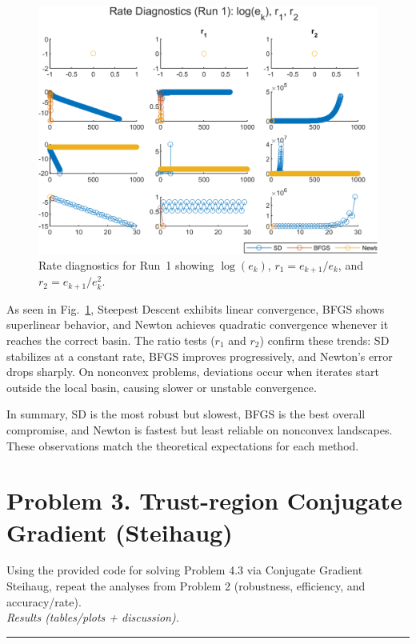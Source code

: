 \documentclass[11pt]{article}
\begin{document}
	\begin{figure}[htbp]
		\centering
		\includegraphics[width=\linewidth]{plots/accuracy_run1.png}
		\caption{Rate diagnostics for Run~1 showing $\log(e_k)$, $r_1=e_{k+1}/e_k$, and $r_2=e_{k+1}/e_k^2$.}
		\label{fig:accuracy}
	\end{figure}
	
	As seen in Fig.~\ref{fig:accuracy}, Steepest Descent exhibits linear convergence, BFGS shows superlinear behavior,
	and Newton achieves quadratic convergence whenever it reaches the correct basin.
	The ratio tests ($r_1$ and $r_2$) confirm these trends: SD stabilizes at a constant rate,
	BFGS improves progressively, and Newton’s error drops sharply.
	On nonconvex problems, deviations occur when iterates start outside the local basin, causing slower or unstable convergence.
	
	In summary, SD is the most robust but slowest, BFGS is the best overall compromise,
	and Newton is fastest but least reliable on nonconvex landscapes.
	These observations match the theoretical expectations for each method.

	\newpage
	
	\section*{Problem 3. Trust-region Conjugate Gradient (Steihaug)}
	
	Using the provided code for solving Problem 4.3 via Conjugate Gradient Steihaug, repeat the analyses from Problem 2 (robustness, efficiency, and accuracy/rate).\\[0.25em]
	\textit{Results (tables/plots + discussion).} \rule{0.9\linewidth}{0.4pt}
	
\end{document}
